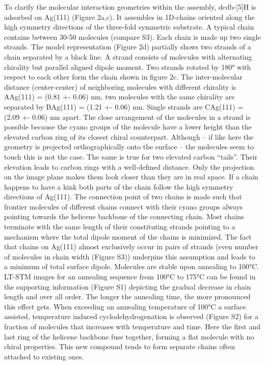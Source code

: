 To clarify the molecular interaction geometries within the assembly, dcdb-[5]H is adsorbed on Ag(111) (Figure 2a,c).  It assembles in 1D-chains oriented along the high symmetry directions of the three-fold symmetric substrate. A typical chain contains between 30-50 molecules (compare S3). Each chain is made up two single strands. The model representation (Figure 2d) partially shows two strands of a chain separated by a black line. A strand consists of molecules with alternating chirality but parallel aligned dipole moment. Two strands rotated by 180° with respect to each other form the chain shown in figure 2c. The inter-molecular distance (center-center) of neighboring molecules with different chirality is AAg(111) = (0.81 +- 0.06) nm, two molecules with the same chirality are separated by BAg(111) = (1.21 +- 0.06) nm. Single strands are CAg(111) = (2.09 +- 0.06) nm apart. The close arrangement of the molecules in a strand is possible because the cyano groups of the molecule have a lower height than the elevated carbon ring of its closest chiral counterpart. Although – if like here the geometry is projected orthographically onto the surface – the molecules seem to touch this is not the case. The same is true for two elevated carbon “tails”. Their elevation leads to carbon rings with a well-defined distance. Only the projection on the image plane makes them look closer than they are in real space. If a chain happens to have a kink both parts of the chain follow the high symmetry directions of Ag(111). The connection point of two chains is made such that frontier molecules of different chains connect with their cyano groups always pointing towards the helicene backbone of the connecting chain. Most chains terminate with the same length of their constituting strands pointing to a mechanism where the total dipole moment of the chains is minimized. The fact that chains on Ag(111) almost exclusively occur in pairs of strands (even number of molecules in chain width (Figure S3)) underpins this assumption and leads to a minimum of total surface dipole. Molecules are stable upon annealing to 100°C. LT-STM images for an annealing sequence from 100°C to 175°C can be found in the supporting information (Figure S1) depicting the gradual decrease in chain length and over all order. The longer the annealing time, the more pronounced this effect gets. When exceeding an annealing temperature of 100°C a surface assisted, temperature induced cyclodehydrogenation is observed (Figure S2) for a fraction of molecules that increases with temperature and time. Here the first and last ring of the helicene backbone fuse together, forming a flat molecule with no chiral properties. This new compound tends to form separate chains often attached to existing ones. 


